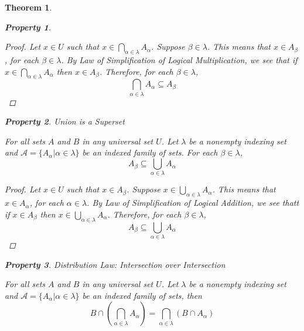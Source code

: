\documentclass{book}
\newtheorem{theorem}{Theorem}[section]
\newtheorem{property}{Property}[theorem]
\theoremstyle{definition}
\theoremstyle{remark}
\newcommand{\cc}[1]{\mathcal{#1}}
\begin{document}
\begin{theorem}
\begin{property}
        \begin{proof}
            Let $x \in U$ such that $x \in \bigcap_{\alpha \in \lambda}{A_{\alpha}}$. Suppose $\beta \in \lambda$. This means that $x \in A_\beta$, for each $\beta \in \lambda$. By Law of Simplification of Logical Multiplication, we see that if $x \in \bigcap_{\alpha \in \lambda}{A_{\alpha}}$ then $x \in A_{\beta}$. Therefore, for each $\beta \in \lambda$, $$ \bigcap_{\alpha \in \lambda}{A_{\alpha}} \subseteq A_{\beta} $$ 
        \end{proof}
    \end{property}
    
    
    \begin{property}
    Union is a Superset \\
        \begin{tcolorbox}
            For all sets $A$ and $B$ in any universal set $U$. Let $\lambda$ be a nonempty indexing set and $\cc{A} = \{ A_{\alpha} | \alpha \in \lambda \}$ be an indexed family of sets. For each $\beta \in \lambda$, 
                \begin{equation*}
                    A_{\beta} \subseteq \bigcup_{\alpha \in \lambda}{A_{\alpha}}
                \end{equation*}
        \end{tcolorbox}
    
        \begin{proof}
            Let $x \in U$ such that $x \in A_{\beta}$. Suppose $x \in \bigcup_{\alpha \in \lambda}{A_{\alpha}}$. This means that $x \in A_\alpha$, for each $\alpha \in \lambda$. By Law of Simplification of Logical Addition, we see thatt if $x \in A_\beta$ then $x \in \bigcup_{\alpha \in \lambda}{A_{\alpha}}$. Therefore, for each $\beta \in \lambda$, $$ A_{\beta} \subseteq \bigcup_{\alpha \in \lambda}{A_{\alpha}} $$ 
        \end{proof}
    \end{property}
    
    
    
    
    \newpage
    \begin{property}
    Distribution Law: Intersection over Intersection \\
        \begin{tcolorbox}
            For all sets $A$ and $B$ in any universal set $U$. Let $\lambda$ be a nonempty indexing set and $\cc{A} = \{ A_{\alpha} | \alpha \in \lambda \}$ be an indexed family of sets, then
                \begin{equation*}
                    B \cap \left ( \bigcap_{\alpha \in \lambda}{A_{\alpha}} \right ) = \bigcap_{\alpha \in \lambda}{(B \cap A_{\alpha})}
                \end{equation*}
        \end{tcolorbox}
    

\end{property}
\end{theorem}
\end{document}

